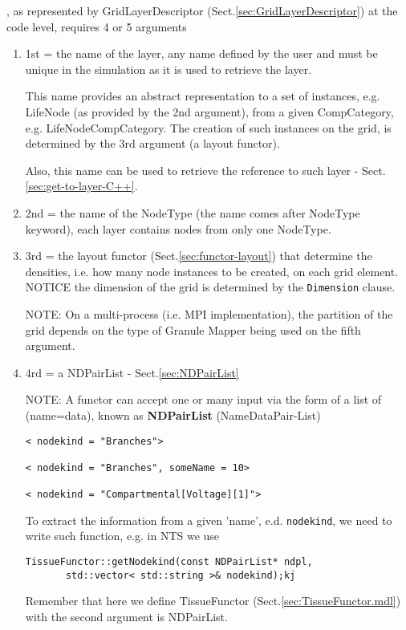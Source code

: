 , as represented by GridLayerDescriptor
(Sect.\ref{sec:GridLayerDescriptor}) at the code level, requires 4 or 5
arguments
\begin{enumerate}
  \item 1st = the name of the layer, any name defined by the user and must be
  unique in the simulation as it is used to retrieve the layer.
  
  This name provides an abstract representation to a set of instances, e.g.
  LifeNode (as provided by the 2nd argument), from a given CompCategory, e.g.
  LifeNodeCompCategory. The creation of such instances on the grid, is
  determined by the 3rd argument (a layout functor).
  
  Also, this name can be used to retrieve the reference to such layer -
  Sect.\ref{sec:get-to-layer-C++}.
  
  \item 2nd = the name of the NodeType (the name comes after NodeType keyword),
  each layer contains nodes from only one NodeType.
  
  \item 3rd = the layout functor (Sect.\ref{sec:functor-layout}) that 
  determine the densities, i.e. how many node instances to be created, on each
  grid element. NOTICE the dimension of the grid is determined by the
  \verb!Dimension! clause. 
  
  
  NOTE: On a multi-process (i.e. MPI implementation), the partition of the grid 
  depends on the type of Granule Mapper being used on the fifth argument.
  
  \item 4rd = a NDPairList - Sect.\ref{sec:NDPairList}

NOTE: A functor can accept one or many input via the form of a list of
(name=data), known as {\bf NDPairList} (NameDataPair-List)

  \begin{verbatim}
< nodekind = "Branches">

< nodekind = "Branches", someName = 10>

< nodekind = "Compartmental[Voltage][1]">
\end{verbatim}

To extract the information from a given 'name', e.d. \verb!nodekind!, we need to
write such function, e.g. in NTS we use 
\begin{verbatim}
TissueFunctor::getNodekind(const NDPairList* ndpl, 
       std::vector< std::string >& nodekind);kj
\end{verbatim}
Remember that here we define TissueFunctor (Sect.\ref{sec:TissueFunctor.mdl})
with the second argument is NDPairList. 



\end{enumerate}
